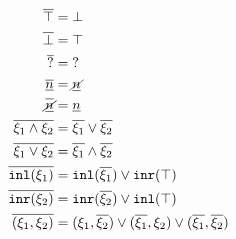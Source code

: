 ~~
\begin{subequations}
\begin{align}
  \cdual{\ctruth} &= \cfalsity \\
  \cdual{\cfalsity} &= \ctruth \\
  \cdual{\cunknown} &= \cunknown \\
  \cdual{\cnum{n}} &= \cnotnum{n} \\
  \cdual{\cnotnum{n}} &= \cnum{n} \\
  \cdual{\cand{\xi_1}{\xi_2}} &= \cor{\cdual{\xi_1}}{\cdual{\xi_2}} \\
  \cdual{\cor{\xi_1}{\xi_2}} &= \cand{\cdual{\xi_1}}{\cdual{\xi_2}} \\
  \cdual{\cinl{\xi_1}} &= \cor{ \cinl{\cdual{\xi_1}} }{ \cinr{\ctruth} } \\
  \cdual{\cinr{\xi_2}} &= \cor{ \cinr{\cdual{\xi_2}} }{ \cinl{\ctruth} } \\
  \cdual{\cpair{\xi_1}{\xi_2}} &=
  \cor{ \cor{ 
    \cpair{\xi_1}{\cdual{\xi_2}}
  }{
    \cpair{\cdual{\xi_1}}{\xi_2}
  }}{
    \cpair{\cdual{\xi_1}}{\cdual{\xi_2}}
  }
\end{align}
\end{subequations}

